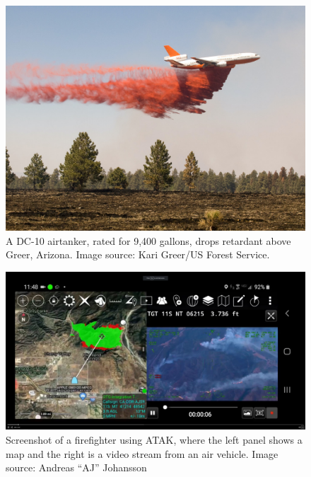 \documentclass[]             %
{NASA}                       %
\theoremstyle{definition}
\begin{document}
\begin{figure}
  \centering
  \includegraphics[scale=0.4]{images/dc10.jpg}
  \caption{A DC-10 airtanker, rated for 9,400 gallons, drops retardant
    above Greer, Arizona. Image source: Kari Greer/US Forest Service.}\label{fig:airtanker}
\end{figure}

\begin{figure}
  \centering
  \includegraphics[scale=0.15]{images/forestfire-videox-scaled.jpg}
  \caption{Screenshot of a firefighter using ATAK, where the left
    panel shows a map and the right is a video stream from an air
    vehicle. Image source: Andreas ``AJ'' Johansson}\label{fig:atak}
\end{figure}
\end{document}
